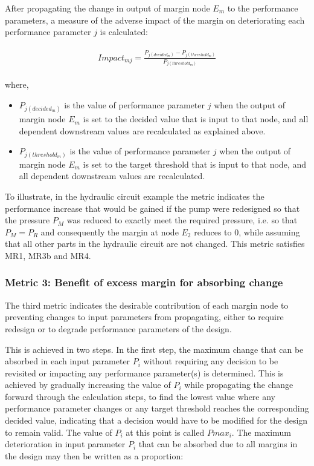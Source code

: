 After propagating the change in output of margin node $E_m$ to the performance parameters, a measure of the adverse impact of the margin on deteriorating each performance parameter $j$ is calculated:


\begin{align}
\begin{split}
\label{eq:dreverse}
Impact_{mj}=\frac{ P_{j(decided_m)} - P_{j(threshold_m) }}{ P_{j(threshold_m) }}
\end{split}
\end{align}

where,

\begin{itemize}
\item $P_{j(decided_m)}$ is the value of performance parameter $j$ when the output of margin node $E_m$ is set to the decided value that is input to that node, and all dependent downstream values are recalculated as explained above.
\item $P_{j(threshold_m) }$ is the value of performance parameter $j$ when the output of margin node $E_m$ is set to the target threshold that is input to that node, and all dependent downstream values are recalculated.
\end{itemize}

To illustrate, in the hydraulic circuit example the metric indicates the performance increase that would be gained if the pump were redesigned so that the pressure $P_M$ was reduced to exactly meet the required pressure, i.e. so that $P_M = P_R$ and consequently the margin at node $E_2$ reduces to $0$, while assuming that all other parts in the hydraulic circuit are not changed. This metric satisfies MR1, MR3b and MR4.

\subsubsection{Metric 3: Benefit of excess margin for absorbing change}\label{metric3}

The third metric indicates the desirable contribution of each margin node to preventing changes to input parameters from propagating, either to require redesign or to degrade performance parameters of the design. 

This is achieved in two steps. In the first step, the maximum change that can be absorbed in each input parameter $P_i$ without requiring any decision to be revisited or impacting any performance parameter(s) is determined. This is achieved by gradually increasing the value of $P_i$ while propagating the change forward through the calculation steps, to find the lowest value where any performance parameter changes or any target threshold reaches the corresponding decided value, indicating that a decision would have to be modified for the design to remain valid. The value of $P_i$ at this point is called $Pmax_{i}$. The maximum deterioration in input parameter $P_i$ that can be absorbed due to all margins in the design may then be written as a proportion:

